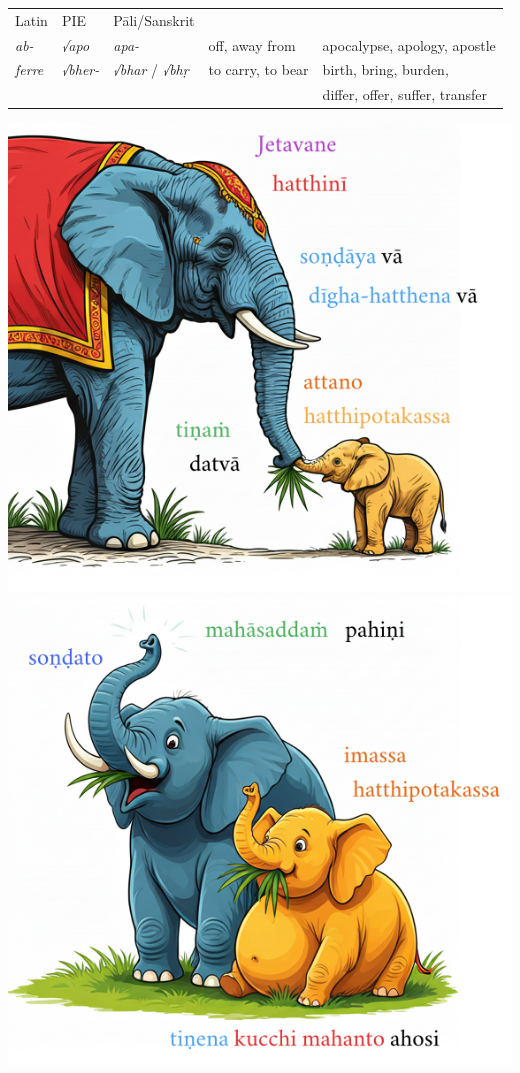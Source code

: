\documentclass[a4paper]{memoir}
\begin{document}
\begin{center}
\begin{tabular}{lllll}
Latin & PIE & Pāli/Sanskrit &  & \\[0pt]
\emph{ab-} & \emph{√apo} & \emph{apa-} & off, away from & apocalypse, apology, apostle\\[0pt]
\emph{ferre} & \emph{√bher-} & \emph{√bhar} / \emph{√bhṛ} & to carry, to bear & birth, bring, burden,\\[0pt]
 &  &  &  & differ, offer, suffer, transfer\\[0pt]
\end{tabular}
\end{center}

\bigskip

{\centering
\includegraphics[width=0.5\linewidth]{./images/jetavane-hatthini.png}%
\includegraphics[width=0.5\linewidth]{./images/sondato-mahasaddam-pahini.png}%
\par}
\end{document}
